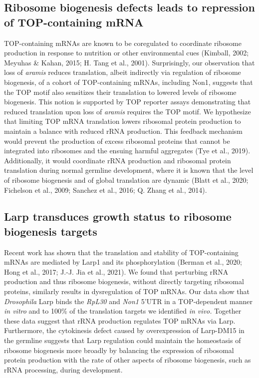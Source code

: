 \documentclass[12pt,oneside]{reedthesis}
\begin{document}
\hypertarget{ribosome-biogenesis-defects-leads-to-repression-of-top-containing-mrna}{%
\subsection{Ribosome biogenesis defects leads to repression of TOP-containing mRNA}\label{ribosome-biogenesis-defects-leads-to-repression-of-top-containing-mrna}}

TOP-containing mRNAs are known to be coregulated to coordinate ribosome production in response to nutrition or other environmental cues (Kimball, 2002; Meyuhas \& Kahan, 2015; H. Tang et al., 2001). Surprisingly, our observation that loss of \emph{aramis} reduces translation, albeit indirectly via regulation of ribosome biogenesis, of a cohort of TOP-containing mRNAs, including Non1, suggests that the TOP motif also sensitizes their translation to lowered levels of ribosome biogenesis. This notion is supported by TOP reporter assays demonstrating that reduced translation upon loss of \emph{aramis} requires the TOP motif. We hypothesize that limiting TOP mRNA translation lowers ribosomal protein production to maintain a balance with reduced rRNA production. This feedback mechanism would prevent the production of excess ribosomal proteins that cannot be integrated into ribosomes and the ensuing harmful aggregates (Tye et al., 2019). Additionally, it would coordinate rRNA production and ribosomal protein translation during normal germline development, where it is known that the level of ribosome biogenesis and of global translation are dynamic (Blatt et al., 2020; Fichelson et al., 2009; Sanchez et al., 2016; Q. Zhang et al., 2014).

\hypertarget{larp-transduces-growth-status-to-ribosome-biogenesis-targets}{%
\subsection{Larp transduces growth status to ribosome biogenesis targets}\label{larp-transduces-growth-status-to-ribosome-biogenesis-targets}}

Recent work has shown that the translation and stability of TOP-containing mRNAs are mediated by Larp1 and its phosphorylation (Berman et al., 2020; Hong et al., 2017; J.-J. Jia et al., 2021). We found that perturbing rRNA production and thus ribosome biogenesis, without directly targeting ribosomal proteins, similarly results in dysregulation of TOP mRNAs. Our data show that \emph{Drosophila} Larp binds the \emph{RpL30} and \emph{Non1} 5'UTR in a TOP-dependent manner \emph{in vitro} and to 100\% of the translation targets we identified \emph{in vivo.} Together these data suggest that rRNA production regulates TOP mRNAs via Larp. Furthermore, the cytokinesis defect caused by overexpression of Larp-DM15 in the germline suggests that Larp regulation could maintain the homeostasis of ribosome biogenesis more broadly by balancing the expression of ribosomal protein production with the rate of other aspects of ribosome biogenesis, such as rRNA processing, during development.
\end{document}
